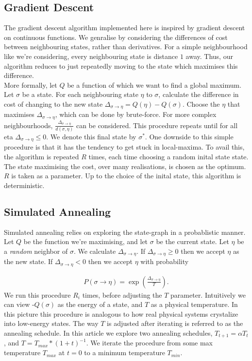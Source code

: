 \documentclass[9pt,twocolumn,twoside,lineno]{pnas-new}
\begin{document}
\subsection*{Gradient Descent}  
The gradient descent algorithm implemented here is inspired by gradient descent on continuous functions. We genralise by considering the differences of cost between neighbouring states, rather than derivatives. For a simple neighbourhood like we're considering, every neighbouring state is distance $1$ away. Thus, our algorithm reduces to just repeatedly moving to the state which maximises this difference. \\
More formally, let $Q$ be a function of which we want to find a global maximum. Let $\sigma$ be a state. For each neighbouring state $\eta$ to $\sigma$, calculate the difference in cost of changing to the new state $\Delta_{\sigma \to \eta} = Q(\eta) - Q(\sigma)$. Choose the $\eta$ that maximises $\Delta_{\sigma \to \eta}$, which can be done by brute-force. For more complex neighbourhoods, $\frac{\Delta_{\sigma \to \eta}}{d(\sigma, \eta)}$ can be considered. This procedure repeats until for all eta $\Delta_{\sigma \to \eta} \leq 0$. We denote this final state by  $\sigma^*$. One downside to this simple procedure is that it has the tendency to get stuck in local-maxima. To avail this, the algorithm is repeated $R$ times, each time choosing a random inital state state. The state maximising the cost, over many realisations, is chosen as the optimum. $R$ is taken as a parameter. Up to the choice of the inital state, this algorithm is deterministic. 

\subsection*{Simulated Annealing}
Simulated annealing relies on exploring the state-graph in a probablistic manner. Let $Q$ be the function we're maximising, and let  $\sigma$ be the current state.  Let $\eta$ be a \textit{random} neighbor of $\sigma$. We calculate  $\Delta_{\sigma \to \eta}$. If $\Delta_{\sigma \to \eta} \geq 0$ then we accept $\eta$ as the new state. If $\Delta_{\sigma \to \eta} < 0$ then we accept $\eta$ with probability

\begin{align*} 
    P(\sigma \to \eta) = \exp(\frac{\Delta_{\sigma \to \eta}}{T}).  
\end{align*} 
We run this procedure $R_{i}$ times, before adjusting the  $T$ parameter. 
Intuitively we can view -$Q(\sigma)$ as the energy of a state, and  $T$ as a physical temperature. In this picture this procedure is analogous to how real physical systems crystalize into low-energy states. 
The way $T$ is adjusted after iterating is referred to as the annealing schedule. In this article we explore two annealing schedules,  $T_{t+1} = \alpha T_{t}$, and $T = T_{max} * (1 +  t)^{-1}$. We iterate the procedure from some max temperature $T_{max}$ at $t = 0$ to a minimum temperature  $T_{min}$.
\end{document}

